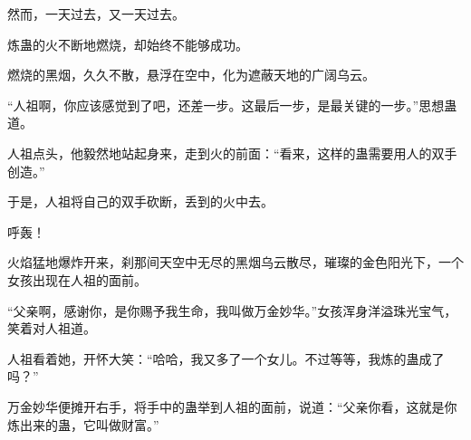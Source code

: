 \begin{this_body}
然而，一天过去，又一天过去。

炼蛊的火不断地燃烧，却始终不能够成功。

燃烧的黑烟，久久不散，悬浮在空中，化为遮蔽天地的广阔乌云。

“人祖啊，你应该感觉到了吧，还差一步。这最后一步，是最关键的一步。”思想蛊道。

人祖点头，他毅然地站起身来，走到火的前面：“看来，这样的蛊需要用人的双手创造。”

于是，人祖将自己的双手砍断，丢到的火中去。

呼轰！

火焰猛地爆炸开来，刹那间天空中无尽的黑烟乌云散尽，璀璨的金色阳光下，一个女孩出现在人祖的面前。

“父亲啊，感谢你，是你赐予我生命，我叫做万金妙华。”女孩浑身洋溢珠光宝气，笑着对人祖道。

人祖看着她，开怀大笑：“哈哈，我又多了一个女儿。不过等等，我炼的蛊成了吗？”

万金妙华便摊开右手，将手中的蛊举到人祖的面前，说道：“父亲你看，这就是你炼出来的蛊，它叫做财富。”

\end{this_body}

